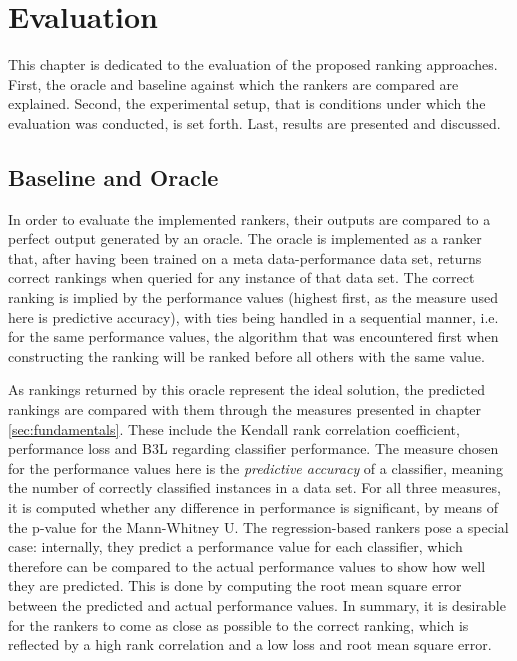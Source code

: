 \chapter{Evaluation}
\label{sec:evaluation}

This chapter is dedicated to the evaluation of the proposed ranking approaches. First, the oracle and baseline against which the rankers are compared are explained. Second, the experimental setup, that is conditions under which the evaluation was conducted, is set forth. Last, results are presented and discussed.

\section{Baseline and Oracle}
In order to evaluate the implemented rankers, their outputs are compared to a perfect output generated by an oracle. The oracle is implemented as a ranker that, after having been trained on a meta data-performance data set, returns correct rankings when queried for any instance of that data set. The correct ranking is implied by the performance values (highest first, as the measure used here is predictive accuracy), with ties being handled in a sequential manner, i.e. for the same performance values, the algorithm that was encountered first when constructing the ranking will be ranked before all others with the same value.

As rankings returned by this oracle represent the ideal solution, the predicted rankings are compared with them through the measures presented in chapter \ref{sec:fundamentals}. These include the Kendall rank correlation coefficient, performance loss and B3L regarding classifier performance. The measure chosen for the performance values here is the \textit{predictive accuracy} of a classifier, meaning the number of correctly classified instances in a data set. For all three measures, it is computed whether any difference in performance is significant, by means of the p-value for the Mann-Whitney U. The regression-based rankers pose a special case: internally, they predict a performance value for each classifier, which therefore can be compared to the actual performance values to show how well they are predicted. This is done by computing the root mean square error between the predicted and actual performance values. In summary, it is desirable for the rankers to come as close as possible to the correct ranking, which is reflected by a high rank correlation and a low loss and root mean square error.

